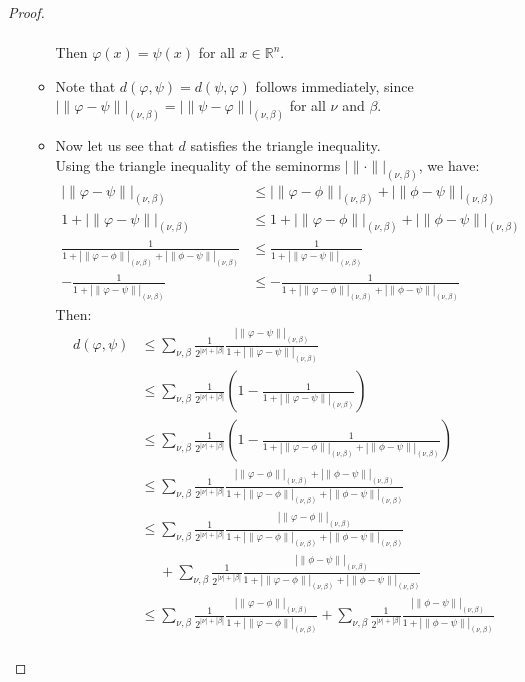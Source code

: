 \begin{proof}{}
\begin{enumerate}
\begin{itemize}
\begin{align*}
			    \end{align*}
			    Then $\varphi(x)=\psi(x)$ for all $x\in\mathbb{R}^n$.
			  \item Note that $d(\varphi,\psi)=d(\psi,\varphi)$ follows immediately, since $|\|\varphi-\psi\||_{(\nu,\beta)}=|\|\psi-\varphi\||_{(\nu,\beta)}$ for all $\nu$ and $\beta$.
			  \item Now let us see that $d$ satisfies the triangle inequality.\\
			    Using the triangle inequality of the seminorms $|\|\cdot\||_{(\nu,\beta)}$, we have:
		      \begin{align*}
				    |\|\varphi-\psi\||_{(\nu,\beta)}&\leq |\|\varphi-\phi\||_{(\nu,\beta)}+|\|\phi-\psi\||_{(\nu,\beta)}\\
				    1+|\|\varphi-\psi\||_{(\nu,\beta)}&\leq 1+ |\|\varphi-\phi\||_{(\nu,\beta)}+|\|\phi-\psi\||_{(\nu,\beta)}\\
				    \frac{1}{1+ |\|\varphi-\phi\||_{(\nu,\beta)}+|\|\phi-\psi\||_{(\nu,\beta)}}&\leq \frac{1}{1+|\|\varphi-\psi\||_{(\nu,\beta)}}\\
				    -\frac{1}{1+|\|\varphi-\psi\||_{(\nu,\beta)}}&\leq -\frac{1}{1+ |\|\varphi-\phi\||_{(\nu,\beta)}+|\|\phi-\psi\||_{(\nu,\beta)}}
			    \end{align*}
			    Then:
			    \begin{align*}
				    d(\varphi,\psi)&\leq \sum_{\nu,\beta}\frac{1}{2^{|\nu|+|\beta|}}\frac{|\|\varphi-\psi\||_{(\nu,\beta)}}{1+|\|\varphi-\psi\||_{(\nu,\beta)}}\\
				    &\leq \sum_{\nu,\beta}\frac{1}{2^{|\nu|+|\beta|}}\left(1-\frac{1}{1+|\|\varphi-\psi\||_{(\nu,\beta)}}\right)\\
				    &\leq \sum_{\nu,\beta}\frac{1}{2^{|\nu|+|\beta|}}\left(1-\frac{1}{1+|\|\varphi-\phi\||_{(\nu,\beta)}+|\|\phi-\psi\||_{(\nu,\beta)}}\right)\\
				    &\leq\sum_{\nu,\beta}\frac{1}{2^{|\nu|+|\beta|}}\frac{|\|\varphi-\phi\||_{(\nu,\beta)}+|\|\phi-\psi\||_{(\nu,\beta)}}{1+|\|\varphi-\phi\||_{(\nu,\beta)}+|\|\phi-\psi\||_{(\nu,\beta)}}\\
				    &\leq\sum_{\nu,\beta}\frac{1}{2^{|\nu|+|\beta|}}\frac{|\|\varphi-\phi\||_{(\nu,\beta)}}{1+|\|\varphi-\phi\||_{(\nu,\beta)}+|\|\phi-\psi\||_{(\nu,\beta)}}\\
            &\phantom{\leq}+\sum_{\nu,\beta}\frac{1}{2^{|\nu|+|\beta|}}\frac{|\|\phi-\psi\||_{(\nu,\beta)}}{1+|\|\varphi-\phi\||_{(\nu,\beta)}+|\|\phi-\psi\||_{(\nu,\beta)}}\\
				    &\leq\sum_{\nu,\beta}\frac{1}{2^{|\nu|+|\beta|}}\frac{|\|\varphi-\phi\||_{(\nu,\beta)}}{1+|\|\varphi-\phi\||_{(\nu,\beta)}}+\sum_{\nu,\beta}\frac{1}{2^{|\nu|+|\beta|}}\frac{|\|\phi-\psi\||_{(\nu,\beta)}}{1+|\|\phi-\psi\||_{(\nu,\beta)}}\\

\end{align*}
\end{itemize}
\end{enumerate}
\end{proof}
